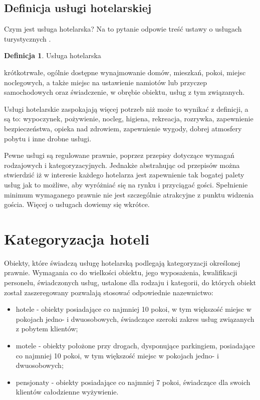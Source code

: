 \documentclass[a4paper,onecolumn,oneside,11pt,wide,floatssmall]{mwrep}
\theoremstyle{definition}
\newtheorem{defn}{Definicja}[section]
\theoremstyle{plain}%
\theoremstyle{remark}
\begin{document}
\subsection{Definicja usługi hotelarskiej}

Czym jest usługa hotelarska? Na to pytanie odpowie treść ustawy o usługach 
turystycznych \cite{ust:tur}.

\begin{defn}{Usługa hotelarska}

krótkotrwałe, ogólnie dostępne wynajmowanie domów, mieszkań, pokoi, miejsc 
noclegowych, a także miejsc na ustawienie namiotów lub przyczep 
samochodowych oraz świadczenie, w obrębie obiektu, usług z tym związanych.

\end{defn}

Usługi hotelarskie zaspokajają więcej potrzeb niż może to wynikać z 
definicji, a są to: wypoczynek, pożywienie, nocleg, higiena, rekreacja, 
rozrywka, zapewnienie bezpieczeństwa, opieka nad zdrowiem, zapewnienie 
wygody, dobrej atmosfery pobytu i inne drobne usługi.

Pewne usługi są regulowane prawnie, poprzez przepisy dotyczące wymagań 
rodzajowych i kategoryzacyjnych. Jednakże abstrahując od przepisów można 
stwierdzić iż w interesie każdego hotelarza jest zapewnienie tak bogatej 
palety usług jak to możliwe, aby wyróżniać się na rynku i przyciągać gości. 
Spełnienie minimum wymaganego prawnie nie jest szczególnie atrakcyjne z 
punktu widzenia gościa. Więcej o usługach dowiemy się wkrótce.

\section{Kategoryzacja hoteli}
Obiekty, które świadczą usługę hotelarską podlegają kategoryzacji określonej 
prawnie\cite{ust:tur}. Wymagania co do wielkości obiektu, jego wyposażenia, 
kwalifikacji personelu, świadczonych usług, ustalone dla rodzaju i 
kategorii, do których obiekt został zaszeregowany pozwalają stosować 
odpowiednie nazewnictwo: 

\begin{itemize}
  \item hotele - obiekty posiadające co najmniej 10 pokoi, w tym większość 
  miejsc w pokojach jedno- i dwuosobowych, świadczące szeroki zakres usług 
  związanych z pobytem klientów;
  \item motele - obiekty położone przy drogach, dysponujące parkingiem, 
  posiadające co najmniej 10 pokoi, w tym większość miejsc w pokojach jedno- 
  i dwuosobowych;
  \item pensjonaty - obiekty posiadające co najmniej 7 pokoi, świadczące dla 
  swoich klientów całodzienne wyżywienie.
\end{itemize}
\end{document}
